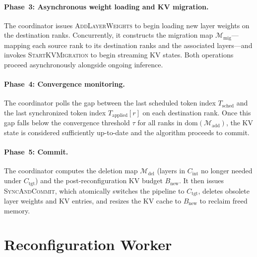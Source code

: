 \documentclass[sigplan,screen]{acmart}
\newcommand{\Ctgt}{C_{\mathrm{tgt}}}
\newcommand{\Ctmp}{C_{\mathrm{int}}}
\newcommand{\Madd}{\mathcal{M}_{\mathrm{add}}}
\newcommand{\Mdel}{\mathcal{M}_{\mathrm{del}}}
\newcommand{\Mmig}{\mathcal{M}_{\mathrm{mig}}}
\newcommand{\Bnew}{B_{\mathrm{new}}}
\begin{document}
\paragraph{Phase~3: Asynchronous weight loading and KV migration.}
The coordinator issues \textsc{AddLayerWeights} to begin loading new layer weights on the destination ranks. Concurrently, it constructs the migration map $\Mmig$---mapping each source rank to its destination ranks and the associated layers---and invokes \textsc{StartKVMigration} to begin streaming KV states. Both operations proceed asynchronously alongside ongoing inference.

\paragraph{Phase~4: Convergence monitoring.}
The coordinator polls the gap between the last scheduled token index $T_{\mathrm{sched}}$ and the last synchronized token index $T_{\mathrm{applied}}[r]$ on each destination rank. Once this gap falls below the convergence threshold $\tau$ for all ranks in $\mathrm{dom}(\Madd)$, the KV state is considered sufficiently up-to-date and the algorithm proceeds to commit.

\paragraph{Phase~5: Commit.}
The coordinator computes the deletion map $\Mdel$ (layers in $\Ctmp$ no longer needed under $\Ctgt$) and the post-reconfiguration KV budget $\Bnew$. It then issues \textsc{SyncAndCommit}, which atomically switches the pipeline to $\Ctgt$, deletes obsolete layer weights and KV entries, and resizes the KV cache to $\Bnew$ to reclaim freed memory.

\section{Reconfiguration Worker}



\end{document}
